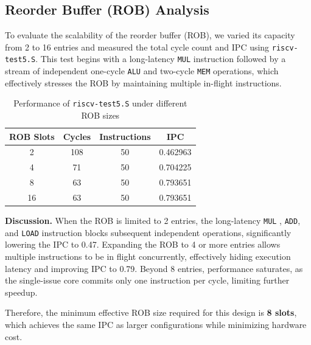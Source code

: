 \documentclass[11pt,a4paper]{article}
\begin{document}
\subsection{Reorder Buffer (ROB) Analysis}

To evaluate the scalability of the reorder buffer (ROB), we varied its capacity from 2 to 16 entries and measured the total cycle count and IPC using \texttt{riscv-test5.S}.  
This test begins with a long-latency \texttt{MUL} instruction followed by a stream of independent one-cycle \texttt{ALU} and two-cycle \texttt{MEM} operations, which effectively stresses the ROB by maintaining multiple in-flight instructions.

\begin{table}[H]
\centering
\caption{Performance of \texttt{riscv-test5.S} under different ROB sizes}
\begin{tabular}{cccc}
\toprule
\textbf{ROB Slots} & \textbf{Cycles} & \textbf{Instructions} & \textbf{IPC} \\
\midrule
2  & 108 & 50 & 0.462963 \\
4  & 71  & 50 & 0.704225 \\
8  & 63  & 50 & 0.793651 \\
16 & 63  & 50 & 0.793651 \\
\bottomrule
\end{tabular}
\end{table}

\noindent
\textbf{Discussion.}  
When the ROB is limited to 2 entries, the long-latency \texttt{MUL} , \texttt{ADD}, and \texttt{LOAD} instruction blocks subsequent independent operations, significantly lowering the IPC to 0.47.  
Expanding the ROB to 4 or more entries allows multiple instructions to be in flight concurrently, effectively hiding execution latency and improving IPC to 0.79.  
Beyond 8 entries, performance saturates, as the single-issue core commits only one instruction per cycle, limiting further speedup.

Therefore, the minimum effective ROB size required for this design is \textbf{8 slots}, which achieves the same IPC as larger configurations while minimizing hardware cost.
\end{document}
